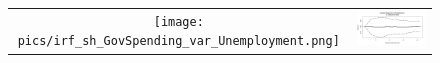 \documentclass[12pt]{article}
\begin{document}
\begin{figure}
\begin{center}
\begin{tabular}{cc}
\texttt{[image: pics/irf\_sh\_GovSpending\_var\_Unemployment.png]} & \includegraphics[scale=0.34]{pics/irf_sh_Taxes_var_Unemployment.png} 
\end{tabular}
\end{center}
\end{figure}
\end{document}
